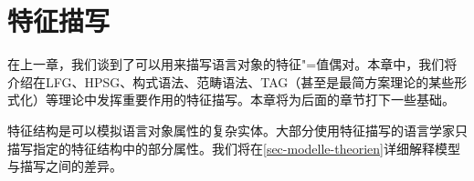 

\chapter{特征描写}
\label{chap-feature-descriptions}

在上一章，我们谈到了可以用来描写语言对象的特征"=值偶对。本章中，我们将介绍在LFG、HPSG、构式语法、范畴语法、TAG（甚至是最简方案理论的某些形式化\citep{Veenstra98a}）等理论中发挥重要作用的特征描写。本章将为后面的章节打下一些基础。

特征结构是可以模拟语言对象属性的复杂实体。大部分使用特征描写的语言学家只描写指定的特征结构中的部分属性。我们将在\ref{sec-modelle-theorien}详细解释模型与描写之间的差异。

